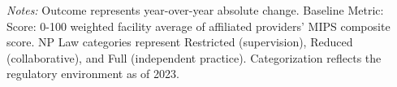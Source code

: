 \begin{table}[htbp]
    \centering
    \caption{Summary of Change in Facility Avg: MIPS Final Score by Authority and Year}
    \label{tab:d_fac_mips_final_score}
    \vspace{0.2cm}
    \vspace{0.1cm}
    \begin{minipage}{\textwidth}
        \footnotesize \textit{Notes:} Outcome represents year-over-year absolute change. Baseline Metric: Score: 0-100 weighted facility average of affiliated providers' MIPS composite score. NP Law categories represent Restricted (supervision), Reduced (collaborative), and Full (independent practice). Categorization reflects the regulatory environment as of 2023.
    \end{minipage}
\end{table}